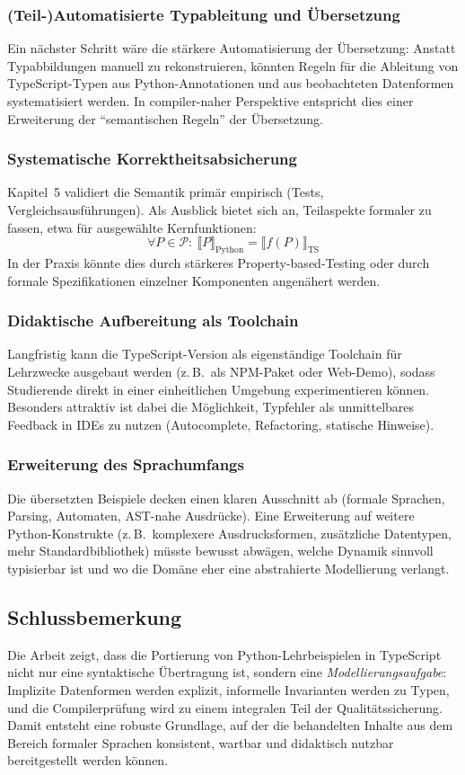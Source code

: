 \subsubsection{(Teil-)Automatisierte Typableitung und Übersetzung}
Ein nächster Schritt wäre die stärkere Automatisierung der Übersetzung: Anstatt Typabbildungen manuell zu rekonstruieren, könnten Regeln für die Ableitung von TypeScript-Typen aus Python-Annotationen und aus beobachteten Datenformen systematisiert werden. In compiler-naher Perspektive entspricht dies einer Erweiterung der ``semantischen Regeln'' der Übersetzung. \autocite[S.304ff]{aho2006compilers}

\subsubsection{Systematische Korrektheitsabsicherung}
Kapitel~5 validiert die Semantik primär empirisch (Tests, Vergleichsausführungen). Als Ausblick bietet sich an, Teilaspekte formaler zu fassen, etwa für ausgewählte Kernfunktionen:
\[
\forall P \in \mathcal{P}:\ \llbracket P \rrbracket_{\text{Python}} = \llbracket f(P) \rrbracket_{\text{TS}}
\]
In der Praxis könnte dies durch stärkeres Property-based-Testing oder durch formale Spezifikationen einzelner Komponenten angenähert werden. \autocite[S.15ff]{aho2006compilers}

\subsubsection{Didaktische Aufbereitung als Toolchain}
Langfristig kann die TypeScript-Version als eigenständige Toolchain für Lehrzwecke ausgebaut werden (z.\,B.\ als NPM-Paket oder Web-Demo), sodass Studierende direkt in einer einheitlichen Umgebung experimentieren können. Besonders attraktiv ist dabei die Möglichkeit, Typfehler als unmittelbares Feedback in IDEs zu nutzen (Autocomplete, Refactoring, statische Hinweise).

\subsubsection{Erweiterung des Sprachumfangs}
Die übersetzten Beispiele decken einen klaren Ausschnitt ab (formale Sprachen, Parsing, Automaten, AST-nahe Ausdrücke). Eine Erweiterung auf weitere Python-Konstrukte (z.\,B.\ komplexere Ausdrucksformen, zusätzliche Datentypen, mehr Standardbibliothek) müsste bewusst abwägen, welche Dynamik sinnvoll typisierbar ist und wo die Domäne eher eine abstrahierte Modellierung verlangt.

\subsection{Schlussbemerkung}
Die Arbeit zeigt, dass die Portierung von Python-Lehrbeispielen in TypeScript nicht nur eine syntaktische Übertragung ist, sondern eine \emph{Modellierungsaufgabe}: Implizite Datenformen werden explizit, informelle Invarianten werden zu Typen, und die Compilerprüfung wird zu einem integralen Teil der Qualitätssicherung. Damit entsteht eine robuste Grundlage, auf der die behandelten Inhalte aus dem Bereich formaler Sprachen konsistent, wartbar und didaktisch nutzbar bereitgestellt werden können. \autocite[S.44ff]{vanderkam2019effective}